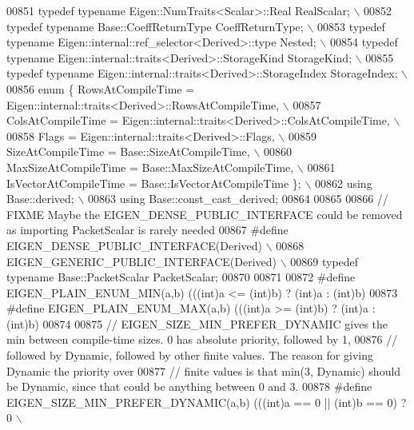 \begin{DoxyCode}
00851 \textcolor{preprocessor}{  typedef typename Eigen::NumTraits<Scalar>::Real RealScalar;  \(\backslash\)}
00852 \textcolor{preprocessor}{  typedef typename Base::CoeffReturnType CoeffReturnType;  \(\backslash\)}
00853 \textcolor{preprocessor}{  typedef typename Eigen::internal::ref\_selector<Derived>::type Nested; \(\backslash\)}
00854 \textcolor{preprocessor}{  typedef typename Eigen::internal::traits<Derived>::StorageKind StorageKind; \(\backslash\)}
00855 \textcolor{preprocessor}{  typedef typename Eigen::internal::traits<Derived>::StorageIndex StorageIndex; \(\backslash\)}
00856 \textcolor{preprocessor}{  enum \{ RowsAtCompileTime = Eigen::internal::traits<Derived>::RowsAtCompileTime, \(\backslash\)}
00857 \textcolor{preprocessor}{        ColsAtCompileTime = Eigen::internal::traits<Derived>::ColsAtCompileTime, \(\backslash\)}
00858 \textcolor{preprocessor}{        Flags = Eigen::internal::traits<Derived>::Flags, \(\backslash\)}
00859 \textcolor{preprocessor}{        SizeAtCompileTime = Base::SizeAtCompileTime, \(\backslash\)}
00860 \textcolor{preprocessor}{        MaxSizeAtCompileTime = Base::MaxSizeAtCompileTime, \(\backslash\)}
00861 \textcolor{preprocessor}{        IsVectorAtCompileTime = Base::IsVectorAtCompileTime \}; \(\backslash\)}
00862 \textcolor{preprocessor}{  using Base::derived; \(\backslash\)}
00863 \textcolor{preprocessor}{  using Base::const\_cast\_derived;}
00864 
00865 
00866 \textcolor{comment}{// FIXME Maybe the EIGEN\_DENSE\_PUBLIC\_INTERFACE could be removed as importing PacketScalar is rarely needed}
00867 \textcolor{preprocessor}{#define EIGEN\_DENSE\_PUBLIC\_INTERFACE(Derived) \(\backslash\)}
00868 \textcolor{preprocessor}{  EIGEN\_GENERIC\_PUBLIC\_INTERFACE(Derived) \(\backslash\)}
00869 \textcolor{preprocessor}{  typedef typename Base::PacketScalar PacketScalar;}
00870 
00871 
00872 \textcolor{preprocessor}{#define EIGEN\_PLAIN\_ENUM\_MIN(a,b) (((int)a <= (int)b) ? (int)a : (int)b)}
00873 \textcolor{preprocessor}{#define EIGEN\_PLAIN\_ENUM\_MAX(a,b) (((int)a >= (int)b) ? (int)a : (int)b)}
00874 
00875 \textcolor{comment}{// EIGEN\_SIZE\_MIN\_PREFER\_DYNAMIC gives the min between compile-time sizes. 0 has absolute priority,
       followed by 1,}
00876 \textcolor{comment}{// followed by Dynamic, followed by other finite values. The reason for giving Dynamic the priority over}
00877 \textcolor{comment}{// finite values is that min(3, Dynamic) should be Dynamic, since that could be anything between 0 and 3.}
00878 \textcolor{preprocessor}{#define EIGEN\_SIZE\_MIN\_PREFER\_DYNAMIC(a,b) (((int)a == 0 || (int)b == 0) ? 0 \(\backslash\)}

\end{DoxyCode}
